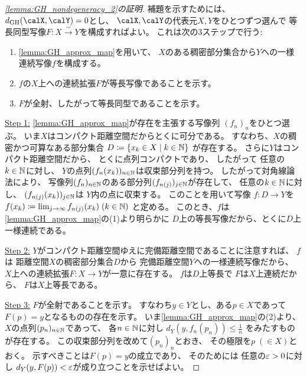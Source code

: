 \documentclass[report, notitlepage]{jlreq}
\newcommand{\GH}{\mathrm{GH}}
\begin{document}
\begin{proof}[\cref{lemma:GH_nondegeneracy_2}の証明]
    補題を示すためには、
    $d_\GH(\calX, \calY) = 0$とし、
    $\calX, \calY$の代表元$X, Y$をひとつずつ選んで
    等長同型写像$F \colon X \stackrel{\sim}{\to} Y$を構成すればよい。
    これは次の3ステップで行う:
    \begin{enumerate}[label=Step \arabic*:]
        \setlength{\leftskip}{1.5em}
        \item \cref{lemma:GH_approx_map}を用いて、
            $X$のある稠密部分集合から$Y$への一様連続写像$f$を構成する。
        \item $f$の$X$上への連続拡張$F$が等長写像であることを示す。
        \item $F$が全射、したがって等長同型であることを示す。
    \end{enumerate}

    \uline{Step 1:} \quad
    \cref{lemma:GH_approx_map}が存在を主張する写像列
    $(f_n)_n$をひとつ選ぶ。
    いま$X$はコンパクト距離空間だからとくに可分である。
    すなわち、$X$の稠密かつ可算なある部分集合
    $D \coloneqq \{ x_k \in X \mid k \in \mathbb{N} \}$
    が存在する。
    さらに$Y$はコンパクト距離空間だから、
    とくに点列コンパクトであり、
    したがって
    任意の$k \in \mathbb{N}$に対し、
    $Y$の点列$(f_n(x_k))_{n \in \mathbb{N}}$は収束部分列を持つ。
    したがって対角線論法により、
    写像列$(f_n)_{n \in \mathbb{N}}$のある部分列$(f_{n(j)})_{j \in \mathbb{N}}$が存在して、
    任意の$k \in \mathbb{N}$に対し、
    $(f_{n(j)}(x_k))_{j \in \mathbb{N}}$は
    $Y$内の点に収束する。
    このことを用いて写像
    $f \colon D \to Y$を
    $f(x_k) \coloneqq \lim_{j \to \infty} f_{n(j)}(x_k) \; (k \in \mathbb{N})$
    と定める。
    このとき、$f$は
    \cref{lemma:GH_approx_map}の(1)より明らかに
    $D$上の等長写像だから、とくに$D$上一様連続である。

    \uline{Step 2:} \quad
    $Y$がコンパクト距離空間ゆえに完備距離空間であることに注意すれば、
    $f$は
    距離空間$X$の稠密部分集合$D$から
    完備距離空間$Y$への一様連続写像だから、
    $X$上への連続拡張$F \colon X \to Y$が一意に存在する。
    $f$は$D$上等長で
    $F$は$X$上連続だから、
    $F$は$X$上等長である。

    \uline{Step 3:} \quad
    $F$が全射であることを示す。
    すなわち$y \in Y$とし、ある$p \in X$であって
    $F(p) = y$となるものの存在を示す。
    いま\cref{lemma:GH_approx_map}の(2)より、
    $X$の点列$(p_n)_{n \in \mathbb{N}}$であって、
    各$n \in \mathbb{N}$に対し
    $d_Y(y, f_n(p_n)) \le \frac{1}{n}$
    をみたすものが存在する。
    この収束部分列を改めて$(p_n)_n$とおき、
    その極限を$p \; (\in X)$とおく。
    示すべきことは$F(p) = y$の成立であり、
    そのためには
    任意の$\varepsilon > 0$に対し
    $d_Y(y, F(p)) < \varepsilon$が成り立つことを示せばよい。


\end{proof}
\end{document}
